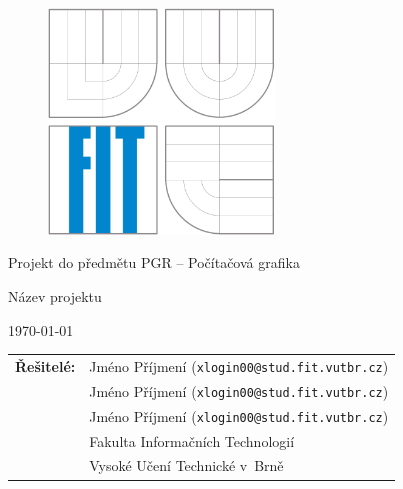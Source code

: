 \begin{titlepage}

\vspace*{1cm}

\begin{figure}
  \centering
  \includegraphics[height=6cm]{images/fit.pdf}
\end{figure}

\vspace*{5mm}

\begin{center}
\begin{Large}
Projekt do předmětu PGR -- Počítačová grafika
\end{Large}
\end{center}

\vspace*{5mm}

\begin{center}
\begin{Huge}
Název projektu \\
\end{Huge}
\end{center}

\vspace*{1cm}

\begin{center}
\begin{Large}
\today
\end{Large}
\end{center}

\vfill

\begin{flushleft}
\begin{large}
\begin{tabular}{ll}

\bf Řešitelé:\hspace{3mm} & Jméno Příjmení (\verb_xlogin00@stud.fit.vutbr.cz_) \\
& Jméno Příjmení (\verb_xlogin00@stud.fit.vutbr.cz_) \\
& Jméno Příjmení (\verb_xlogin00@stud.fit.vutbr.cz_) \\
& Fakulta Informačních Technologií \\
& Vysoké Učení Technické v~Brně

\end{tabular}
\end{large}
\end{flushleft}

\end{titlepage}

